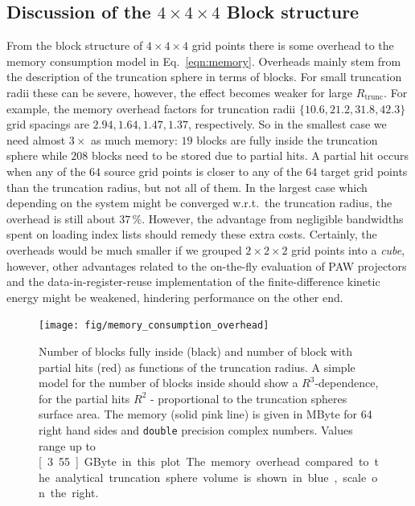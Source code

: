 \documentclass[oribibl]{llncs}
\newcommand{\um}[1]{_{\mathrm{#1}}}
\newcommand{\ttt}[1]{\texttt{#1}}
\begin{document}
\subsection{Discussion of the $4 \times 4 \times 4$ Block structure}
%
From the block structure of $4 \times 4 \times 4$ grid points there is some overhead to the memory consumption model in Eq.~\ref{eqn:memory}. Overheads mainly stem from the description of the truncation sphere in terms of blocks.
For small truncation radii these can be severe, however, the effect becomes weaker for large $R\um{trunc}$.
For example, the memory overhead factors for truncation radii $\{10.6, 21.2, 31.8, 42.3\}$ grid spacings are ${2.94, 1.64, 1.47, 1.37}$, respectively. So in the smallest case we need almost $3\times$ as much memory: $19$ blocks are fully inside the truncation sphere while $208$ blocks need to be stored due to partial hits. A partial hit occurs when any of the $64$ source grid points is closer to any of the $64$ target grid points than the truncation radius, but not all of them.
In the largest case which depending on the system might be converged w.r.t.~the truncation radius, the overhead is still about $37\,\%$. However, the advantage from negligible bandwidths spent on loading index lists should remedy these extra costs.
Certainly, the overheads would be much smaller if we grouped $2\times 2\times 2$ grid points into a \emph{cube}, however,
other advantages related to the on-the-fly evaluation of \ac{PAW} projectors and the data-in-register-reuse implementation of the finite-difference kinetic energy might be weakened, hindering performance on the other end.

\begin{figure}[t]
	\centering
	\texttt{[image: fig/memory\_consumption\_overhead]}
	\label{fig:memory-consumption-overhead}
	\caption{Number of blocks fully inside (black) and number of block with partial hits (red) as functions of the truncation radius.
	A simple model for the number of blocks inside should show a $R^3$-dependence, for the partial hits $R^2$ - proportional to the truncation spheres surface area. 
	The memory (solid pink line) is given in MByte for 64 right hand sides and \ttt{double} precision complex numbers.
	Values range up to \unit[3.55]{GByte} in this plot.
	The memory overhead compared to the analytical truncation sphere volume is shown in blue, scale on the right.} 
\end{figure}
\end{document}
